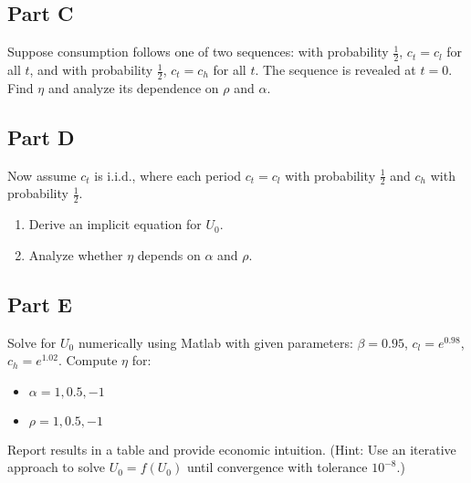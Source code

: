 \documentclass[10pt,a4paper]{article}
\begin{document}
\subsection*{Part C}
Suppose consumption follows one of two sequences: with probability $\frac{1}{2}$, $c_t = c_l$ for all $t$, and with probability $\frac{1}{2}$, $c_t = c_h$ for all $t$. The sequence is revealed at $t = 0$. Find $\eta$ and analyze its dependence on $\rho$ and $\alpha$.

\subsection*{Part D}
Now assume $c_t$ is i.i.d., where each period $c_t = c_l$ with probability $\frac{1}{2}$ and $c_h$ with probability $\frac{1}{2}$.
\begin{enumerate}
    \item Derive an implicit equation for $U_0$.
    \item Analyze whether $\eta$ depends on $\alpha$ and $\rho$.
\end{enumerate}

\subsection*{Part E}
Solve for $U_0$ numerically using Matlab with given parameters: $\beta = 0.95$, $c_l = e^{0.98}$, $c_h = e^{1.02}$. Compute $\eta$ for:
\begin{itemize}
    \item $\alpha = 1, 0.5, -1$
    \item $\rho = 1, 0.5, -1$
\end{itemize}
Report results in a table and provide economic intuition.
(Hint: Use an iterative approach to solve $U_0 = f(U_0)$ until convergence with tolerance $10^{-8}$.)
\end{document}
